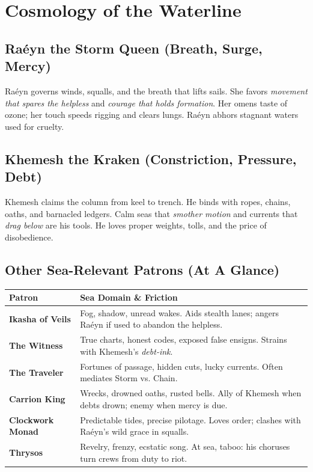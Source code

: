 \documentclass[11pt,oneside]{book}
\begin{document}
\section{Cosmology of the Waterline}

\subsection*{Raéyn the Storm Queen (Breath, Surge, Mercy)}
Raéyn governs winds, squalls, and the breath that lifts sails. She favors \emph{movement that spares the helpless} and \emph{courage that holds formation}. Her omens taste of ozone; her touch speeds rigging and clears lungs. Raéyn abhors stagnant waters used for cruelty.

\subsection*{Khemesh the Kraken (Constriction, Pressure, Debt)}
Khemesh claims the column from keel to trench. He binds with ropes, chains, oaths, and barnacled ledgers. Calm seas that \emph{smother motion} and currents that \emph{drag below} are his tools. He loves proper weights, tolls, and the price of disobedience.

\subsection*{Other Sea-Relevant Patrons (At A Glance)}
\begin{tabularx}{\linewidth}{@{}p{3.1cm} X@{}}
\toprule
\textbf{Patron} & \textbf{Sea Domain \& Friction}\\
\midrule
\textbf{Ikasha of Veils} & Fog, shadow, unread wakes. Aids stealth lanes; angers Raéyn if used to abandon the helpless.\\
\textbf{The Witness} & True charts, honest codes, exposed false ensigns. Strains with Khemesh's \emph{debt-ink}.\\
\textbf{The Traveler} & Fortunes of passage, hidden cuts, lucky currents. Often mediates Storm vs. Chain.\\
\textbf{Carrion King} & Wrecks, drowned oaths, rusted bells. Ally of Khemesh when debts drown; enemy when mercy is due.\\
\textbf{Clockwork Monad} & Predictable tides, precise pilotage. Loves order; clashes with Raéyn's wild grace in squalls.\\
\textbf{Thrysos} & Revelry, frenzy, ecstatic song. At sea, taboo: his choruses turn crews from duty to riot.\\
\bottomrule
\end{tabularx}
\end{document}
